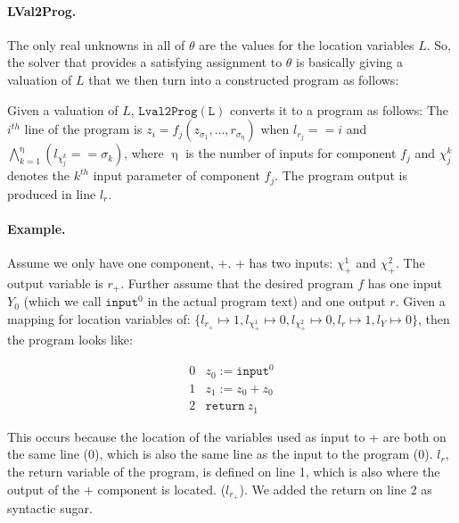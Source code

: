 \documentclass[11pt]{article}
\begin{document}
 \paragraph{LVal2Prog.}  The only real unknowns in all of $\theta$ are the values for the location variables $L$.  So, the solver that provides a satisfying assignment to $\theta$ is basically giving a valuation of $L$ that we then turn into a constructed program as follows:
 
Given a valuation of $L$, $\mathtt{Lval2Prog(L)}$ converts it to a program as follows: The $i^{th}$ line of the  program is $z_i = f_j(z_{\sigma_1}, ..., r_{\sigma_\upeta})$  
when $l_{r_j} == i$ and $\bigwedge\limits_{k=1}^{\upeta} (l_{\chi_j^k} == \sigma_k)$, where $\upeta$ is the number of inputs for component $f_j$ and $\chi_j^k$ denotes the $k^{th}$ input parameter of component $f_j$.  The program output is produced in line $l_r$.  

\paragraph{Example.}  Assume we only have one component, +.  + has two inputs: $\chi^1_+$ and $\chi^2_+$.  The output variable is $r_+$.  Further assume that the desired program $f$ has one input $Y_0$ (which we call $\mathtt{input}^0$ in the actual program text) and one output $r$.  Given a mapping for location variables of: 
$\{ l_{r_+}\mapsto 1, l_{\chi^1_+} \mapsto 0, l_{\chi^2_+} \mapsto 0, l_r \mapsto 1, l_Y \mapsto 0 \}$, then the program looks like:

\[
\begin{array}{ll}
0 & z_0 := \mathtt{input}^0 \\
1 & z_1 := z_0 + z_0 \\
2 & \mathtt{return}~ z_1
\end{array}
\]

This occurs because the location of the variables used as input to + are both on the same line (0), which is also the same line as the input to the program (0).  $l_r$, the return variable of the program, is defined on line 1, which is also where the output of the + component is located.  ($l_{r_+}$).  We added the return on line 2 as syntactic sugar.



\end{document}
